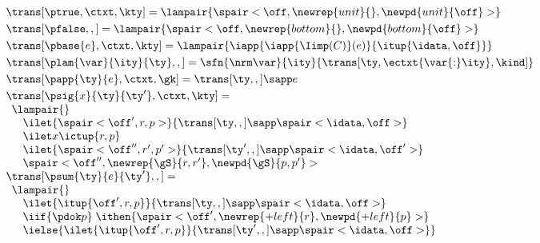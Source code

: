\begin{figure*}
\small
{} 

\[
\begin{array}{l}
\trans[\ptrue,\ctxt,\kty] =
  \lampair{\spair<\off,\newrep{unit}{},\newpd{unit}{\off}>}
\\[3pt] %
\trans[\pfalse,,] =
  \lampair{\spair<\off,\newrep {bottom}{},\newpd {bottom}{\off}>}
\\[3pt] %
\trans[\pbase{e},\ctxt,\kty] =
  \lampair{\iapp {\iapp {\Iimp(C)} (e)} {\itup {\idata,\off}}}
\\[3pt] %
\trans[\plam{\var}{\ity}{\ty},,] =
   \sfn{\nrm\var}{\ity}{\trans[\ty,\ectxt{\var{:}\ity},\kind]}
\\[3pt] %
\trans[\papp{\ty}{e},\ctxt,\gk] =
  \trans[\ty,,] \sapp e  
\\[3pt]
\trans[\psig{x}{\ty}{\ty'},\ctxt,\kty] = \\
  \begin{array}{l}  
    \lampair{} \\
    \quad  \ilet {\spair<\off',r,p>} 
    {{\trans[\ty,,]} \sapp \spair<\idata,\off>} \\
    \quad  \ilet x {\ictup{r,p}}\\
    \quad  \ilet {\spair<\off'',r',p'>} 
    {{\trans[\ty',,]} \sapp \spair<\idata,\off'>} \\
    \quad \spair<\off'',\newrep {\gS}{r,r'},\newpd {\gS}{p,p'}>
  \end{array}  
\\
  \trans[\psum{\ty}{e}{\ty'},,] = \\
  \begin{array}{l}  
  \lampair{} \\
  \quad \ilet {\itup{\off',r,p}}{\trans[\ty,,] \sapp \spair<\idata,\off>} \\
  \quad \iif {\pdok p} \; \ithen {
    \def \r {\newrep {+left}{r}}
    \def \p {\newpd {+left}{p}}
    \spair<\off',\r,\p>} \\
  \quad \ielse {\ilet {\itup{\off',r,p}}{\trans[\ty',,] \sapp \spair<\idata,\off>}} \\
  \quad 
  {  %
}
\end{array}
\end{array}\]
\end{figure*}
